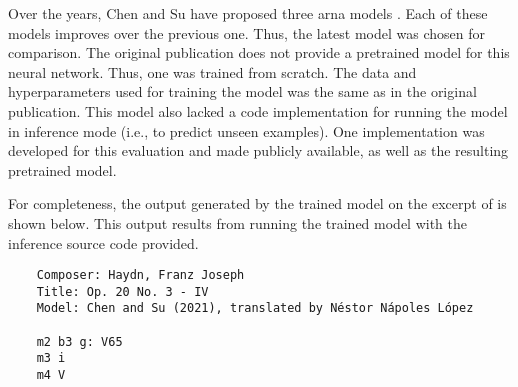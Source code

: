 
Over the years, Chen and Su have proposed three \gls{arna}
models \parencite{chen2018functional, chen2019harmony,
chen2021attend}. Each of these models improves over the
previous one. Thus, the latest model
\parencite{chen2021attend} was chosen for comparison. The
original publication does not provide a pretrained model
for this neural network. Thus, one was trained from scratch.
The data and hyperparameters used for training the model was
the same as in the original publication. This model also
lacked a code implementation for running the model in
inference mode (i.e., to predict unseen examples). One
implementation was developed for this evaluation and made
publicly available, as well as the resulting pretrained
model.

For completeness, the output generated by the trained model
on the excerpt of  is shown below. This
output results from running the trained model with the
inference source code provided.

\begin{verbatim}
    Composer: Haydn, Franz Joseph
    Title: Op. 20 No. 3 - IV
    Model: Chen and Su (2021), translated by Néstor Nápoles López

    m2 b3 g: V65
    m3 i
    m4 V
\end{verbatim}
